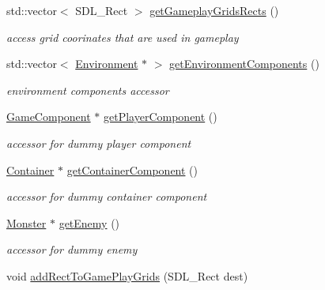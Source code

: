 \begin{DoxyCompactItemize}
std\+::vector$<$ S\+D\+L\+\_\+\+Rect $>$ \hyperlink{class_level_a040994ac065280b1d52524bbcba2bbaa}{get\+Gameplay\+Grids\+Rects} ()
\begin{DoxyCompactList}\small\item\em access grid coorinates that are used in gameplay \end{DoxyCompactList}\item 
\hypertarget{class_level_ae3f60439fa36c03b1dfcf1d3e6594b23}{}\label{class_level_ae3f60439fa36c03b1dfcf1d3e6594b23} 
std\+::vector$<$ \hyperlink{class_environment}{Environment} $\ast$ $>$ \hyperlink{class_level_ae3f60439fa36c03b1dfcf1d3e6594b23}{get\+Environment\+Components} ()
\begin{DoxyCompactList}\small\item\em environment components accessor \end{DoxyCompactList}\item 
\hypertarget{class_level_a190ab96a4270516c4f89e356231ef243}{}\label{class_level_a190ab96a4270516c4f89e356231ef243} 
\hyperlink{class_game_component}{Game\+Component} $\ast$ \hyperlink{class_level_a190ab96a4270516c4f89e356231ef243}{get\+Player\+Component} ()
\begin{DoxyCompactList}\small\item\em accessor for dummy player component \end{DoxyCompactList}\item 
\hypertarget{class_level_a8ff05204c68c313eb656cd2897842721}{}\label{class_level_a8ff05204c68c313eb656cd2897842721} 
\hyperlink{class_container}{Container} $\ast$ \hyperlink{class_level_a8ff05204c68c313eb656cd2897842721}{get\+Container\+Component} ()
\begin{DoxyCompactList}\small\item\em accessor for dummy container component \end{DoxyCompactList}\item 
\hypertarget{class_level_a0c2bba08da53fd7894c80c4e6ecd402c}{}\label{class_level_a0c2bba08da53fd7894c80c4e6ecd402c} 
\hyperlink{class_monster}{Monster} $\ast$ \hyperlink{class_level_a0c2bba08da53fd7894c80c4e6ecd402c}{get\+Enemy} ()
\begin{DoxyCompactList}\small\item\em accessor for dummy enemy \end{DoxyCompactList}\item 
\hypertarget{class_level_ac5fecd0532486e19176f0ca3dced9c23}{}\label{class_level_ac5fecd0532486e19176f0ca3dced9c23} 
void \hyperlink{class_level_ac5fecd0532486e19176f0ca3dced9c23}{add\+Rect\+To\+Game\+Play\+Grids} (S\+D\+L\+\_\+\+Rect dest)

\end{DoxyCompactItemize}
